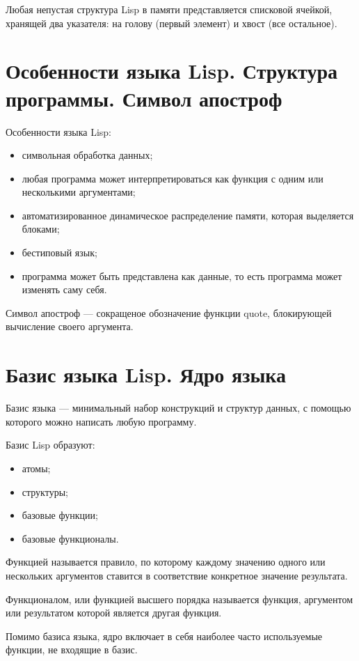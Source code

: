 Любая непустая структура Lisp в памяти представляется списковой ячейкой,
хранящей два указателя: на голову (первый элемент) и хвост (все остальное).

\section{Особенности языка Lisp. Структура программы. Символ апостроф}

Особенности языка Lisp:
\begin{itemize}
	\item символьная обработка данных;
	\item любая программа может интерпретироваться как функция с
	одним или несколькими аргументами;
	\item автоматизированное динамическое распределение памяти, которая
	выделяется блоками;
	\item бестиповый язык;
	\item программа может быть представлена как данные, то есть программа
	может изменять саму себя.
\end{itemize}

Символ апостроф --- сокращеное обозначение функции quote, блокирующей
вычисление своего аргумента.

\section{Базис языка Lisp. Ядро языка}

Базис языка --- минимальный набор конструкций и структур данных, с помощью
которого можно написать любую программу.

Базис Lisp образуют:
\begin{itemize}
	\item атомы;
	\item структуры;
	\item базовые функции;
	\item базовые функционалы.
\end{itemize}

Функцией называется правило, по которому каждому значению одного или нескольких  аргументов ставится в соответствие конкретное значение результата.

Функционалом, или функцией высшего порядка называется функция, аргументом или  результатом которой является другая функция.

Помимо базиса языка, ядро включает в себя наиболее часто используемые функции, не входящие в базис.

